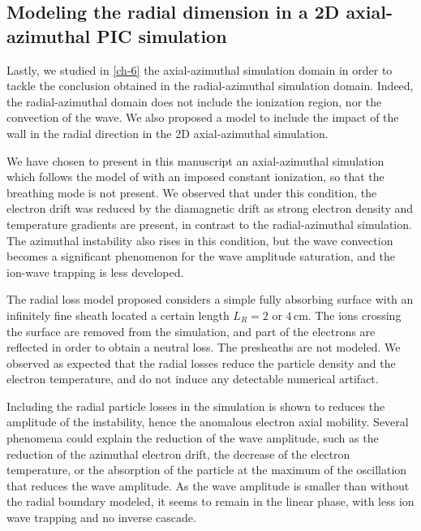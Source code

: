   \subsection{Modeling the radial dimension in a 2D axial-azimuthal PIC simulation}

    Lastly, we studied in \cref{ch-6} the axial-azimuthal simulation domain in order to tackle the conclusion obtained in the radial-azimuthal simulation domain.
    Indeed, the radial-azimuthal domain does not include the ionization region, nor the convection of the wave.
    We also proposed a model to include the impact of the wall in the radial direction in the 2D axial-azimuthal simulation.

    We have chosen to present in this manuscript an axial-azimuthal simulation which follows the model of \citet{boeuf2018} with an imposed constant ionization, so that the breathing mode is not present.
    We observed that under this condition, the electron drift was reduced by the diamagnetic drift as strong electron density and temperature gradients are present, in contrast to the radial-azimuthal simulation.
    The azimuthal instability also rises in this condition, but the wave convection becomes a significant phenomenon for the wave amplitude saturation, and the ion-wave trapping is less developed.

    The radial loss model proposed considers a simple fully absorbing surface with an infinitely fine sheath located a certain length $L_R=2$ or $4$\,cm.
    The ions crossing the surface are removed from the simulation, and part of the electrons are reflected in order to obtain a neutral loss.
    The presheaths are not modeled.
    We observed as expected that the radial losses reduce the particle density and the electron temperature, and do not induce any detectable numerical artifact.
    
    
    Including the radial particle losses in the simulation is shown to reduces the amplitude of the instability, hence the anomalous electron axial mobility.
    Several phenomena could explain the reduction of the wave amplitude, such as the reduction of the azimuthal electron drift, the decrease of the electron temperature, or the absorption of the particle at the maximum of the oscillation that reduces the wave amplitude.
    As the wave amplitude is smaller than without the radial boundary modeled, it seems to remain in the linear phase, with less ion wave trapping and no inverse cascade.


